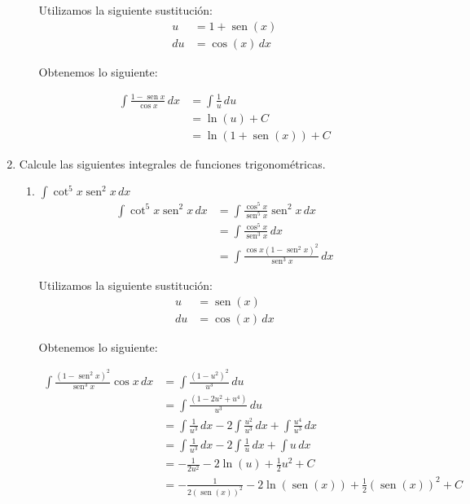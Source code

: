 \documentclass[a4paper,10pt]{article}
\newcommand{\dis}{\displaystyle}
\def\sin{\operatorname{sen}}
\begin{document}
\begin{enumerate}
\begin{enumerate}[label=\emph{\alph*)}]
Utilizamos la siguiente sustitución:
\begin{align*}
u  &=  1 + \sin(x)      \\
du &= \cos(x)  \, dx
\end{align*}
\dotfill [1 punto]

Obtenemos lo siguiente:



\begin{align*}
 \dis \int \frac{1-\sin x}{\cos x}\, dx  &=  \int \frac{1}{u}  \, du\\
							     &=  \ln (u) + C \\
                                 &=  \ln (1+ \sin(x)) + C
\end{align*}

\end{enumerate}
\dotfill [1 punto]
\newpage

\item Calcule las siguientes integrales de funciones
trigonom\'{e}tricas.
\begin{enumerate}[label=\emph{\alph*)}]
\item $\dis \int \cot^5 x\sin^2 x\, dx$
\begin{align*}
 \dis \int \cot^5 x\sin^2 x\, dx  &=    \dis \int \frac{\cos^5 x}{\sin^5 x}\sin^2 x\, dx\\
 										 &=    \dis \int \frac{\cos^5 x}{\sin^3 x}\, dx\\
                                         &=    \dis \int \frac{\cos x (1-\sin^2 x)^2 }{\sin^3 x}\, dx
\end{align*}


Utilizamos la siguiente sustitución:
\begin{align*}
u  &= \sin(x)      \\
du &= \cos(x)  \, dx
\end{align*}
\dotfill [1 punto]

Obtenemos lo siguiente:

\begin{align*}
 \dis \int \frac{ (1-\sin^2 x)^2 }{\sin^3 x}\cos x \, dx  &=    \dis \int \frac{(1-u^2)^2 }{u^3}\, du\\
 										 &=    \dis \int \frac{(1-2u^2 + u^4) }{u^3}\, du\\
                                         &=    \dis \int \frac{1}{u^3 }\, dx - 2 \int \frac{u^2}{u^3 }\, dx + \int \frac{u^4}{u^3 }\, dx\\
                                         &=    \dis \int \frac{1}{u^3 }\, dx - 2 \int \frac{1}{u }\, dx + \int u\, dx\\
                                         &=    \dis -\frac{1}{2u^2 } - 2 \ln(u) +  \frac{1}{2}u^2 + C\\
                                         &=    \dis -\frac{1}{2(\sin(x))^2 } - 2 \ln(\sin(x)) +  \frac{1}{2}(\sin(x))^2 + C
\end{align*}
\dotfill [1 punto]


\end{enumerate}
\end{enumerate}
\end{document}
